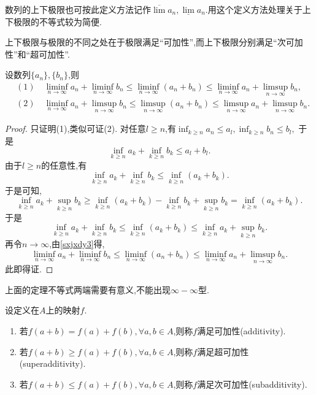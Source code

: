 \begin{remark}
    数列的上下极限也可按此定义方法记作$\overline{\lim}a_n,\underline{\lim}a_n$.用这个定义方法处理关于上下极限的不等式较为简便.
\end{remark}

上下极限与极限的不同之处在于极限满足“可加性”,而上下极限分别满足“次可加性”和“超可加性”.

\begin{proposition}[上极限的次可加性和下极限的超可加性]
    设数列$\{a_n\},\{b_n\}$,则
    \begin{align*}
        &(1)\quad \liminf_{n\to\infty}a_n +\liminf_{n\to\infty}b_n\leqslant \liminf_{n\to\infty}(a_n+b_n)\leqslant \liminf_{n\to\infty}a_n+\limsup_{n\to\infty}b_n,\\
        &(2)\quad \liminf_{n\to\infty}a_n+\limsup_{n\to\infty}b_n\leqslant\limsup_{n\to\infty}(a_n+b_n)\leqslant\limsup_{n\to\infty}a_n+\limsup_{n\to\infty}b_n.
    \end{align*}
\end{proposition}

\begin{proof}
    只证明(1),类似可证(2).
    对任意$l\geqslant n$,有$\inf_{k\geqslant n}a_n\leqslant a_l,\inf_{k\geqslant n}b_n\leqslant b_l,$
    于是\[\inf_{k\geqslant n}a_k+\inf_{k\geqslant n}b_k\leqslant a_l+b_l.\]由于$l\geqslant n$的任意性,有
    \[\inf_{k\geqslant n}a_k+\inf_{k\geqslant n}b_k\leqslant \inf_{k\geqslant n}(a_k+b_k).\]
    于是可知,
    \[\inf_{k\geqslant n}a_k+\sup_{k\geqslant n}b_k\geqslant\inf_{k\geqslant n}(a_k+b_k)-\inf_{k\geqslant n}b_k+\sup_{k\geqslant n}b_k=\inf_{k\geqslant n}(a_k+b_k).\]
    于是
    \[\inf_{k\geqslant n}a_k +\inf_{k\geqslant n}b_k\leqslant\inf_{k\geqslant n}(a_k+b_k)\leqslant\inf_{k\geqslant n}a_k+\sup_{k\geqslant n}b_k.\]
    再令$n\to\infty$,由\ref{sxjxdy3}得,
    \[\liminf_{n\to\infty}a_n+\liminf_{n\to\infty}b_n\leqslant\liminf_{n\to\infty}(a_n+b_n)\leqslant\liminf_{n\to\infty}a_n+\limsup_{n\to\infty}b_n.\]
    此即得证.
\end{proof}

\begin{remark}
    上面的定理不等式两端需要有意义,不能出现$\infty -\infty$型.
\end{remark}

\begin{remark}
    设定义在$A$上的映射$f$.
    \begin{enumerate}
        \item 若$f(a+b)=f(a)+f(b),\forall a,b\in A$,则称$f$满足可加性(additivity).
        \item 若$f(a+b)\geqslant f(a)+f(b),\forall a,b\in A$,则称$f$满足超可加性(superadditivity).
        \item 若$f(a+b)\leqslant f(a)+f(b),\forall a,b\in A$,则称$f$满足次可加性(subadditivity).
    \end{enumerate}
\end{remark}